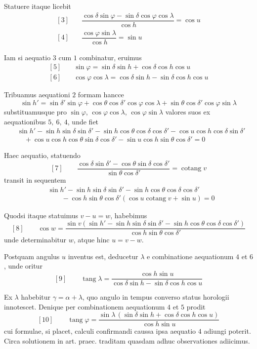 Statuere itaque licebit
\[
\begin{array}{rl}
{}[3]\quad&\dfrac{\cos\delta\sin\varphi-\sin\delta\cos\varphi\cos\lambda}{\cos h}=\cos u\\[4pt]
{}[4]\quad&\dfrac{\cos\varphi\sin\lambda}{\cos h}=\sin u
\end{array}
\]

Iam si aequatio $3$ cum $1$ combinatur, eruimus
\[
\begin{array}{rl}
{}[5]\quad&\sin\varphi=\sin\delta\sin h+\cos\delta\cos h\cos u\\
{}[6]\quad&\cos\varphi\cos\lambda=\cos\delta\sin h-\sin\delta\cos h\cos u
\end{array}
\]

Tribuamus aequationi $2$ formam hancce
\[
\sin h'=\sin\delta'\sin\varphi+\cos\theta\cos\delta'\cos\varphi\cos\lambda+\sin\theta\cos\delta'\cos\varphi\sin\lambda
\]
substituamusque pro $\sin\varphi$, $\cos\varphi\cos\lambda$, $\cos\varphi\sin\lambda$ valores suos ex aequationibus $5,\ 6,\ 4$, unde fiet
\[
\begin{aligned}
&\sin h'-\sin h\sin\delta\sin\delta'-\sin h\cos\theta\cos\delta\cos\delta'-\cos u\cos h\cos\delta\sin\delta'\\
&\quad+\cos u\cos h\cos\theta\sin\delta\cos\delta'-\sin u\cos h\sin\theta\cos\delta'=0
\end{aligned}
\]

Haec aequatio, statuendo
\[
{}[7]\qquad\frac{\cos\delta\sin\delta'-\cos\theta\sin\delta\cos\delta'}{\sin\theta\cos\delta'}=\operatorname{cotang}v
\]
transit in sequentem
\[
\begin{aligned}
&\sin h'-\sin h\sin\delta\sin\delta'-\sin h\cos\theta\cos\delta\cos\delta'\\
&\qquad-\cos h\sin\theta\cos\delta'(\cos u\operatorname{cotang}v+\sin u)=0
\end{aligned}
\]

Quodsi itaque statuimus $v-u=w$, habebimus
\[
{}[8]\qquad\cos w=\frac{\sin v(\sin h'-\sin h\sin\delta\sin\delta'-\sin h\cos\theta\cos\delta\cos\delta')}{\cos h\sin\theta\cos\delta'}
\]
unde determinabitur $w$, atque hinc $u=v-w$.

Postquam angulus $u$ inventus est, deducetur $\lambda$ e combinatione aequationum $4$ et $6$, unde oritur
\[
{}[9]\qquad\operatorname{tang}\lambda=\frac{\cos h\sin u}{\cos\delta\sin h-\sin\delta\cos h\cos u}
\]

Ex $\lambda$ habebitur $\gamma=\alpha+\lambda$, quo angulo in tempus converso status horologii innotescet. Denique per combinationem aequationum $4$ et $5$ prodit
\[
{}[10]\qquad\operatorname{tang}\varphi=\frac{\sin\lambda\,(\sin\delta\sin h+\cos\delta\cos h\cos u)}{\cos h\sin u}
\]
cui formulae, si placet, calculi confirmandi caussa ipsa aequatio $4$ adiungi poterit.
Circa solutionem in art. praec. traditam quasdam adhuc observationes adiicimus.

